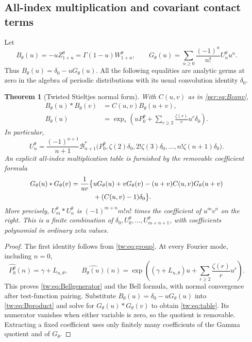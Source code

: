 \documentclass[11pt,letterpaper]{article}
\numberwithin{equation}{section}
\theoremstyle{plain}
\newtheorem{theorem}{Theorem}[section]
\theoremstyle{definition}
\theoremstyle{remark}
\begin{document}
\subsection{All-index multiplication and covariant contact terms}

Let
\begin{equation}\label{tw:eq:B}
 B_\theta(u)=-uZ_{1+u}^\theta
      =\Gamma(1-u)W_{1+u}^\theta,
 \qquad
 G_\theta(u)=\sum_{n\ge0}\frac{(-1)^n}{n!}U_n^\theta u^n.
\end{equation}
Thus $B_\theta(u)=\delta_0-uG_\theta(u)$. All the following
equalities are analytic germs at zero in the algebra of periodic
distributions with its usual convolution identity $\delta_0$.

\begin{theorem}[Twisted Stieltjes normal form]
\label{tw:thm:normalform}
With $C(u,v)$ as in \eqref{per:eq:Bconv},
\begin{align}
 B_\theta(u)*B_\theta(v)&=C(u,v)B_\theta(u+v),
 \label{tw:eq:Bproduct}\\
 B_\theta(u)&=\exp_*\left(uP_0^\theta+
                \sum_{r\ge2}\frac{\zeta(r)}r u^r\delta_0\right).
 \label{tw:eq:Bellgenerator}
\end{align}
In particular,
\begin{equation}\label{tw:eq:Bell}
 U_n^\theta=\frac{(-1)^{n+1}}{n+1}
 \mathcal B_{n+1}^*
 \bigl(P_0^\theta,\zeta(2)\delta_0,2!\zeta(3)\delta_0,
                            \ldots,n!\zeta(n+1)\delta_0\bigr).
\end{equation}
An explicit all-index multiplication table is furnished by the
removable coefficient formula
\begin{align}
 G_\theta(u)*G_\theta(v)
 =\frac{1}{uv}\bigl\{&uG_\theta(u)+vG_\theta(v)
       -(u+v)C(u,v)G_\theta(u+v)\notag\\
       &+(C(u,v)-1)\delta_0\bigr\}.
 \label{tw:eq:table}
\end{align}
More precisely, $U_m^\theta*U_n^\theta$ is $(-1)^{m+n}m!n!$
times the coefficient of $u^mv^n$ on the right. This is a finite
combination of $\delta_0,U_0^\theta,\ldots,U_{m+n+1}^\theta$,
with coefficients polynomial in ordinary zeta values.
\end{theorem}

\begin{proof}
The first identity follows from \eqref{tw:eq:group}. At every
Fourier mode, including $n=0$,
\[
 \widehat{P_0^\theta}(n)=\gamma+L_{n,\theta},\qquad
 \widehat{B_\theta(u)}(n)
       =\exp\left((\gamma+L_{n,\theta})u+
                         \sum_{r\ge2}\frac{\zeta(r)}r u^r\right).
\]
This proves \eqref{tw:eq:Bellgenerator} and the Bell formula, with
normal convergence after test-function pairing. Substitute
$B_\theta(u)=\delta_0-uG_\theta(u)$ into
\eqref{tw:eq:Bproduct} and solve for
$G_\theta(u)*G_\theta(v)$ to obtain \eqref{tw:eq:table}. Its
numerator vanishes when either variable is zero, so the quotient
is removable. Extracting a fixed coefficient uses only finitely
many coefficients of the Gamma quotient and of $G_\theta$.
\end{proof}
\end{document}
